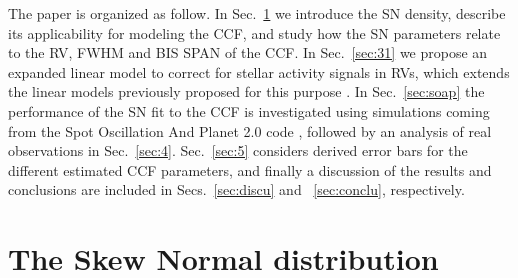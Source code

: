 \documentclass{aa}
\begin{document}

The paper is organized as follow. In Sec.~\ref{sec:2} we introduce the SN density, describe its applicability for modeling the CCF, and study how the SN parameters relate to the RV, FWHM and BIS SPAN of the CCF. 
%
In Sec.~\ref{sec:31} we propose an expanded linear model to correct for stellar activity signals in RVs, which extends the linear models previously proposed for this purpose \citep[e.g.][]{Dumusque:2017aa,Feng:2017aa}. 
%
In Sec.~\ref{sec:soap} the performance of the SN fit to the CCF is investigated using simulations coming from the Spot Oscillation And Planet 2.0 code \citep[SOAP 2.0,][]{Dumusque-2014b}, followed by an analysis of real observations in Sec.~\ref{sec:4}.
%
Sec.~\ref{sec:5} considers derived error bars for the different estimated CCF parameters, and finally a discussion of the results and conclusions are included in Secs.~\ref{sec:discu} and ~\ref{sec:conclu}, respectively.

\section{The Skew Normal distribution} \label{sec:2}
\end{document}
